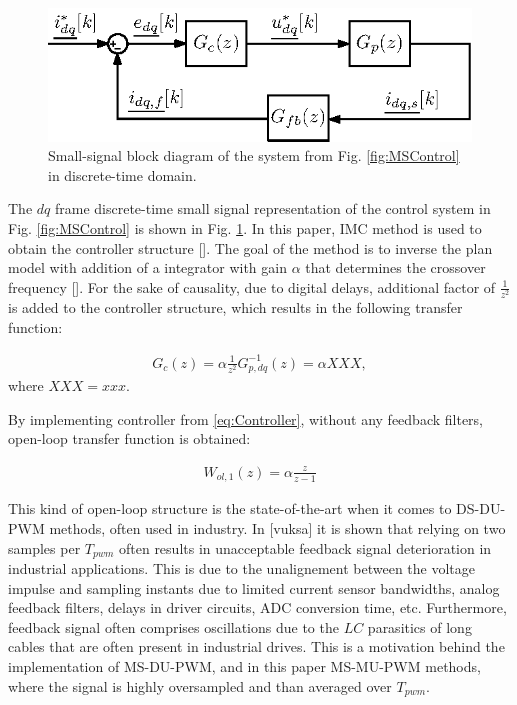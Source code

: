 \documentclass[journal]{IEEEtran}
\begin{document}
\begin{figure}[t!]
    \centerline{\includegraphics[width=0.95\linewidth]{figures/small_signal.eps}}
    \caption{Small-signal block diagram of the system from Fig. \ref{fig:MSControl} in discrete-time domain.}
    \label{fig:SmallSignal}
\end{figure}

The $dq$ frame discrete-time small signal representation of the control system in Fig. \ref{fig:MSControl} is shown in Fig. \ref{fig:SmallSignal}. In this paper, IMC method is used to obtain the controller structure []. The goal of the method is to inverse the plan model with addition of a integrator with gain $\alpha$ that determines the crossover frequency []. For the sake of causality, due to digital delays, additional factor of $\frac{1}{z^2}$ is added to the controller structure, which results in the following transfer function:

\begin{equation}
\begin{aligned}
G_{c}(z) = \alpha \frac{1}{z^2} G^{-1}_{p,dq}(z)  =  \alpha XXX,
\label{eq:Controller} 
\end{aligned}    
\end{equation}
where $XXX = xxx$.

By implementing controller from \eqref{eq:Controller}, without any feedback filters, open-loop transfer function is obtained:

\begin{equation}
\begin{aligned}
W_{ol,1}(z) = \alpha \frac{z}{z-1}
\label{eq:Controller} 
\end{aligned}    
\end{equation}

This kind of open-loop structure is the state-of-the-art when it comes to DS-DU-PWM methods, often used in industry. In [vuksa] it is shown that relying on two samples per $T_{pwm}$ often results in unacceptable feedback signal deterioration in industrial applications. This is due to the unalignement between the voltage impulse and sampling instants due to limited current sensor bandwidths, analog feedback filters, delays in driver circuits, ADC conversion time, etc. Furthermore, feedback signal often comprises oscillations due to the $LC$ parasitics of long cables that are often present in industrial drives. This is a motivation behind the implementation of MS-DU-PWM, and in this paper MS-MU-PWM methods, where the signal is highly oversampled and than averaged over $T_{pwm}$.
\end{document}
